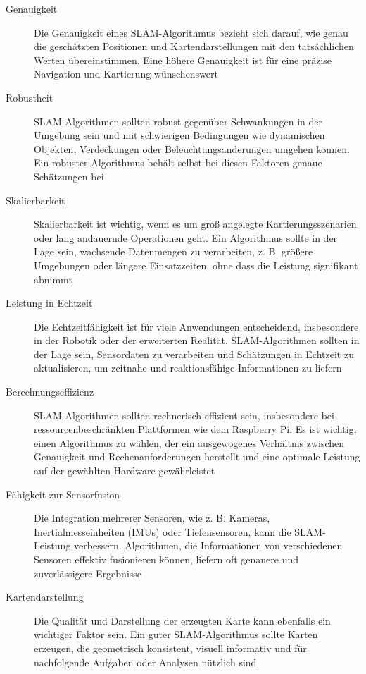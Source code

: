 \begin{description}
    \item[Genauigkeit]{Die Genauigkeit eines SLAM-Algorithmus bezieht sich darauf, wie genau die geschätzten Positionen und Kartendarstellungen mit den tatsächlichen Werten übereinstimmen. Eine höhere Genauigkeit ist für eine präzise Navigation und Kartierung wünschenswert}
    \item[Robustheit]{SLAM-Algorithmen sollten robust gegenüber Schwankungen in der Umgebung sein und mit schwierigen Bedingungen wie dynamischen Objekten, Verdeckungen oder Beleuchtungsänderungen umgehen können. Ein robuster Algorithmus behält selbst bei diesen Faktoren genaue Schätzungen bei} 
    \item[Skalierbarkeit]{Skalierbarkeit ist wichtig, wenn es um groß angelegte Kartierungsszenarien oder lang andauernde Operationen geht. Ein Algorithmus sollte in der Lage sein, wachsende Datenmengen zu verarbeiten, z. B. größere Umgebungen oder längere Einsatzzeiten, ohne dass die Leistung signifikant abnimmt}
    \item[Leistung in Echtzeit]{Die Echtzeitfähigkeit ist für viele Anwendungen entscheidend, insbesondere in der Robotik oder der erweiterten Realität. SLAM-Algorithmen sollten in der Lage sein, Sensordaten zu verarbeiten und Schätzungen in Echtzeit zu aktualisieren, um zeitnahe und reaktionsfähige Informationen zu liefern}
    \item[Berechnungseffizienz]{SLAM-Algorithmen sollten rechnerisch effizient sein, insbesondere bei ressourcenbeschränkten Plattformen wie dem Raspberry Pi. Es ist wichtig, einen Algorithmus zu wählen, der ein ausgewogenes Verhältnis zwischen Genauigkeit und Rechenanforderungen herstellt und eine optimale Leistung auf der gewählten Hardware gewährleistet}
    \item[Fähigkeit zur Sensorfusion]{Die Integration mehrerer Sensoren, wie z. B. Kameras, Inertialmesseinheiten (IMUs) oder Tiefensensoren, kann die SLAM-Leistung verbessern. Algorithmen, die Informationen von verschiedenen Sensoren effektiv fusionieren können, liefern oft genauere und zuverlässigere Ergebnisse}
    \item[Kartendarstellung]{Die Qualität und Darstellung der erzeugten Karte kann ebenfalls ein wichtiger Faktor sein. Ein guter SLAM-Algorithmus sollte Karten erzeugen, die geometrisch konsistent, visuell informativ und für nachfolgende Aufgaben oder Analysen nützlich sind} 
\end{description}

